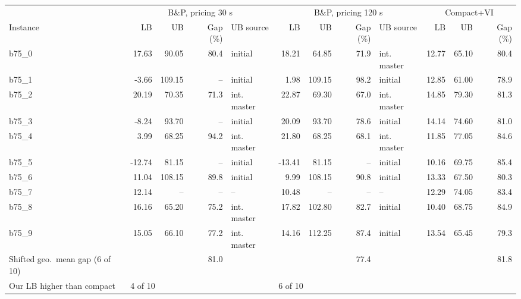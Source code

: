 {\small\setlength{\tabcolsep}{3pt}
\begin{tabular}{lrrrlrrrlrrr}
\toprule
 & \multicolumn{4}{c}{B\&P, pricing 30 s} & \multicolumn{4}{c}{B\&P, pricing 120 s} & \multicolumn{3}{c}{Compact+VI} \\
\cmidrule(lr){2-5}\cmidrule(lr){6-9}\cmidrule(lr){10-12}
Instance & LB & UB & Gap (\%) & UB source & LB & UB & Gap (\%) & UB source & LB & UB & Gap (\%) \\
\midrule
b75\_0 & 17.63 & 90.05 & 80.4 & initial & 18.21 & 64.85 & 71.9 & int. master & 12.77 & 65.10 & 80.4 \\
b75\_1 & -3.66 & 109.15 & -- & initial & 1.98 & 109.15 & 98.2 & initial & 12.85 & 61.00 & 78.9 \\
b75\_2 & 20.19 & 70.35 & 71.3 & int. master & 22.87 & 69.30 & 67.0 & int. master & 14.85 & 79.30 & 81.3 \\
b75\_3 & -8.24 & 93.70 & -- & initial & 20.09 & 93.70 & 78.6 & initial & 14.14 & 74.60 & 81.0 \\
b75\_4 & 3.99 & 68.25 & 94.2 & int. master & 21.80 & 68.25 & 68.1 & int. master & 11.85 & 77.05 & 84.6 \\
b75\_5 & -12.74 & 81.15 & -- & initial & -13.41 & 81.15 & -- & initial & 10.16 & 69.75 & 85.4 \\
b75\_6 & 11.04 & 108.15 & 89.8 & initial & 9.99 & 108.15 & 90.8 & initial & 13.33 & 67.50 & 80.3 \\
b75\_7 & 12.14 & -- & -- & -- & 10.48 & -- & -- & -- & 12.29 & 74.05 & 83.4 \\
b75\_8 & 16.16 & 65.20 & 75.2 & int. master & 17.82 & 102.80 & 82.7 & initial & 10.40 & 68.75 & 84.9 \\
b75\_9 & 15.05 & 66.10 & 77.2 & int. master & 14.16 & 112.25 & 87.4 & initial & 13.54 & 65.45 & 79.3 \\
\midrule
Shifted geo.\ mean gap (6 of 10) &  &  & 81.0 &  &  &  & 77.4 &  &  &  & 81.8 \\
Our LB higher than compact & \multicolumn{4}{l}{4 of 10} & \multicolumn{4}{l}{6 of 10} &  &  &  \\
\bottomrule
\end{tabular}}
